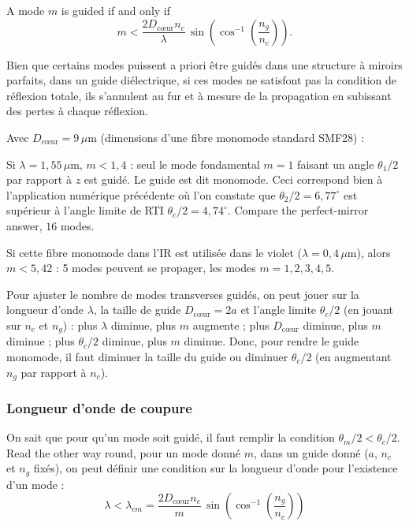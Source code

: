 \begin{theorem}
  A mode $m$ is guided if and only if
  \begin{equation*}
    m < \frac{2D_{\text{cœur}}n_c}{\lambda}\,
        \sin\!\left(\cos^{-1}\!\left(\frac{n_g}{n_c}\right)\right).
  \end{equation*}
\end{theorem}

Bien que certains modes puissent a priori être guidés dans une structure à
miroirs parfaits, dans un guide diélectrique, si ces modes ne satisfont pas la
condition de réflexion totale, ils s'annulent au fur et à mesure de la
propagation en subissant des pertes à chaque réflexion.

\begin{example}
  Avec $D_{\text{cœur}} = 9\,\mu$m (dimensions d'une fibre monomode standard
  SMF28) :
  \begin{subpart}
    \item Si $\lambda = 1{,}55\,\mu$m, $m < 1{,}4$ : seul le mode fondamental
      $m = 1$ faisant un angle $\theta_1/2$ par rapport à $z$ est guidé. Le
      guide est dit monomode. Ceci correspond bien à l'application numérique
      précédente où l'on constate que $\theta_2/2 = 6{,}77^\circ$ est
      supérieur à l'angle limite de RTI $\theta_c/2 = 4{,}74^\circ$. Compare
      the perfect-mirror answer, $16$ modes.
    \item Si cette fibre monomode dans l'IR est utilisée dans le violet
      ($\lambda = 0{,}4\,\mu$m), alors $m < 5{,}42$ : 5 modes peuvent se
      propager, les modes $m = 1,2,3,4,5$.
  \end{subpart}
\end{example}

\begin{conclusion}
  Pour ajuster le nombre de modes transverses guidés, on peut jouer sur la
  longueur d'onde $\lambda$, la taille de guide $D_{\text{cœur}} = 2a$ et
  l'angle limite $\theta_c/2$ (en jouant sur $n_c$ et $n_g$) : plus
  $\lambda$ diminue, plus $m$ augmente ; plus $D_{\text{cœur}}$ diminue, plus
  $m$ diminue ; plus $\theta_c/2$ diminue, plus $m$ diminue. Donc, pour rendre
  le guide monomode, il faut diminuer la taille du guide ou diminuer
  $\theta_c/2$ (en augmentant $n_g$ par rapport à $n_c$).
\end{conclusion}

\subsubsection{Longueur d'onde de coupure}
On sait que pour qu'un mode soit guidé, il faut remplir la condition
$\theta_m/2 < \theta_c/2$. Read the other way round, pour un mode donné $m$,
dans un guide donné ($a$, $n_c$ et $n_g$ fixés), on peut définir une condition
sur la longueur d'onde pour l'existence d'un mode :
\begin{equation*}
  \boxed{\;\lambda < \lambda_{cm}
    = \frac{2D_{\text{cœur}}n_c}{m}\,
      \sin\!\left(\cos^{-1}\!\left(\frac{n_g}{n_c}\right)\right)\;}
\end{equation*}

